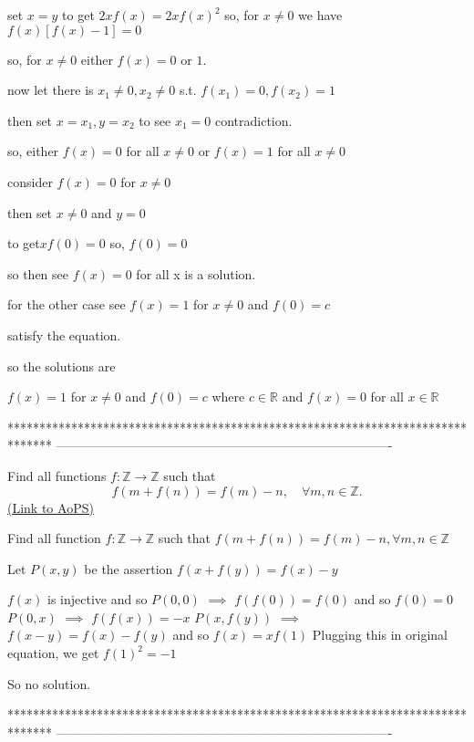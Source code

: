 \begin{solution}
	set $x=y $ to get $2xf(x)=2xf(x)^2$
so, for $x\neq 0$  we have $ f(x)[f(x)-1]=0$

so, for $x\neq 0$ either $f(x)=0 $ or $1$.

now let there is $x_{1}\neq 0, x_{2}\neq 0$ s.t. $f(x_{1})=0,f(x_{2})=1$

then set $x=x_{1},y=x_{2} $ to see $x_{1}=0$ contradiction.

so, either $f(x)=0$ for all $x\neq 0$
or $f(x)=1$ for all $x\neq 0$

consider $f(x)=0$ for $x\neq 0$

then set $x\neq 0$ and $y=0$

to get$xf(0)=0$ so, $f(0)=0$

so then see $f(x)=0 $ for all x is a solution.

for the other case see $f(x)=1 $ for $x\neq 0$ and $f(0)=c$

satisfy the equation.


so the solutions are

$f(x)=1 $ for $x\neq 0$ and $f(0)=c$ where $c\in \mathbb R$
and
$f(x)=0$ for all $x\in \mathbb R$
\end{solution}
*******************************************************************************
-------------------------------------------------------------------------------

\begin{problem}
	Find all functions $f:\mathbb{Z} \to \mathbb{Z}$ such that \[f\left( {m + f\left( n \right)} \right) = f\left( m \right) - n, \quad  \forall m,n \in \mathbb{Z}.\]
	\flushright \href{https://artofproblemsolving.com/community/c6h391861}{(Link to AoPS)}
\end{problem}



\begin{solution}
	\begin{tcolorbox}Find all function $f:\mathbb{Z} \to \mathbb{Z}$ such that $f\left( {m + f\left( n \right)} \right) = f\left( m \right) - n,   \forall m,n \in \mathbb{Z}$\end{tcolorbox}
Let $P(x,y)$ be the assertion $f(x+f(y))=f(x)-y$

$f(x)$ is injective and so $P(0,0)$ $\implies$ $f(f(0))=f(0)$ and so $f(0)=0$
$P(0,x)$ $\implies$ $f(f(x))=-x$
$P(x,f(y))$ $\implies$ $f(x-y)=f(x)-f(y)$ and so $f(x)=xf(1)$
Plugging this in original equation, we get $f(1)^2=-1$

So no solution.
\end{solution}
*******************************************************************************
-------------------------------------------------------------------------------

